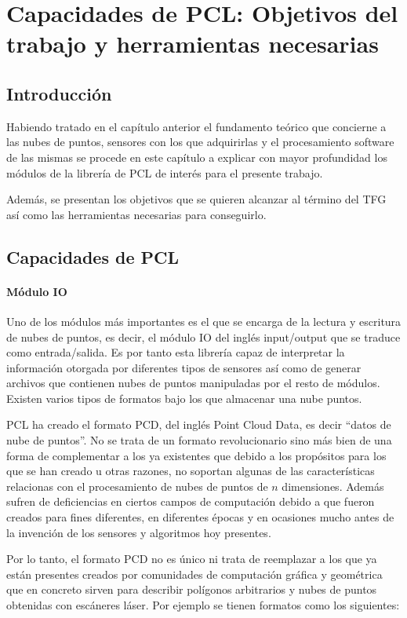 \chapter{Capacidades de PCL: Objetivos del trabajo y herramientas necesarias}

\section{Introducción}
Habiendo tratado en el capítulo anterior el fundamento teórico que concierne a las nubes de puntos, sensores con los que adquirirlas y el procesamiento software de las mismas se procede en este capítulo a explicar con mayor profundidad los módulos de la librería de PCL de interés para el presente trabajo.

Además, se presentan los objetivos que se quieren alcanzar al término del TFG así como las herramientas necesarias para conseguirlo.


\section{Capacidades de PCL}
\subsubsection{Módulo IO}
Uno de los módulos más importantes es el que se encarga de la lectura y escritura de nubes de puntos, es decir, el módulo IO del inglés input/output que se traduce como entrada/salida. Es por tanto esta librería capaz de interpretar la información otorgada por diferentes tipos de sensores así como de generar archivos que contienen nubes de puntos manipuladas por el resto de módulos.
Existen varios tipos de formatos bajo los que almacenar una nube puntos.

PCL ha creado el formato PCD, del inglés Point Cloud Data, es decir ``datos de nube de puntos''. No se trata de un formato revolucionario sino más bien de una forma de complementar a los ya existentes que debido a los propósitos para los que se han creado u otras razones, no soportan algunas de las características relacionas con el procesamiento de nubes de puntos de $n$ dimensiones. Además sufren de deficiencias en ciertos campos de computación debido a que fueron creados para fines diferentes, en diferentes épocas y en ocasiones mucho antes de la invención de los sensores y algoritmos hoy presentes.

Por lo tanto, el formato PCD no es único ni trata de reemplazar a los que ya están presentes creados por comunidades de computación gráfica y geométrica que en concreto sirven para describir polígonos arbitrarios y nubes de puntos obtenidas con escáneres láser. Por ejemplo se tienen formatos como los siguientes:


